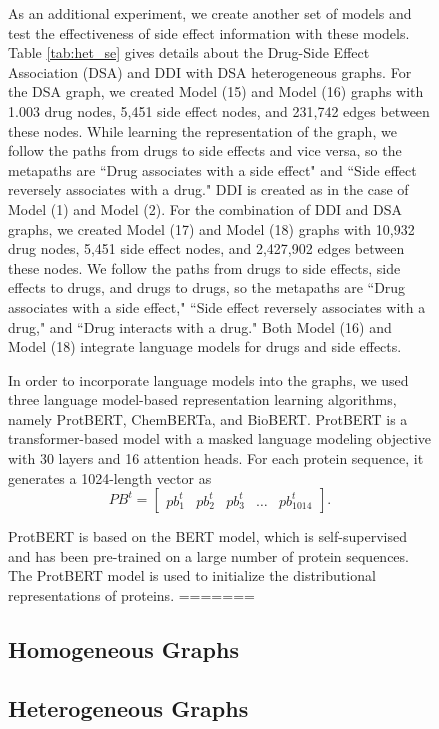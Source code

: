 \begin{figure}[h]
As an additional experiment, we create another set of models and test the effectiveness of side effect information with these models. Table \ref{tab:het_se} gives details about the Drug-Side Effect Association (DSA) and DDI with DSA heterogeneous graphs. For the DSA graph, we created Model (15) and Model (16) graphs with 1.003 drug nodes, 5,451 side effect nodes, and 231,742 edges between these nodes. While learning the representation of the graph, we follow the paths from drugs to side effects and vice versa, so the metapaths are ``Drug associates with a side effect" and ``Side effect reversely associates with a drug."  DDI is created as in the case of Model (1) and Model (2). For the combination of DDI and DSA graphs, we created Model (17) and Model (18) graphs with 10,932 drug nodes, 5,451 side effect nodes, and 2,427,902 edges between these nodes. We follow the paths from drugs to side effects, side effects to drugs, and drugs to drugs, so the metapaths are ``Drug associates with a side effect," ``Side effect reversely associates with a drug," and ``Drug interacts with a drug." Both Model (16) and Model (18) integrate language models for drugs and side effects.

In order to incorporate language models into the graphs, we used three language model-based representation learning algorithms, namely ProtBERT, ChemBERTa, and BioBERT. 
ProtBERT is a transformer-based model with a masked language modeling objective with 30 layers and 16 attention heads. For each protein sequence, it generates a 1024-length vector as
\begin{equation}
    PB^{t} = \left[\begin{array}{cccccc} pb_1^{t} & pb_2^{t} & pb_3^{t} & \ldots & pb_1014^{t} \end{array} \right].
\end{equation}

\newpage
ProtBERT is based on the BERT model, which is self-supervised and has been pre-trained on a large number of protein sequences. The ProtBERT model is used to initialize the distributional representations of proteins.
=======
\subsection{Homogeneous Graphs}



\subsection{Heterogeneous Graphs}



\end{figure}
